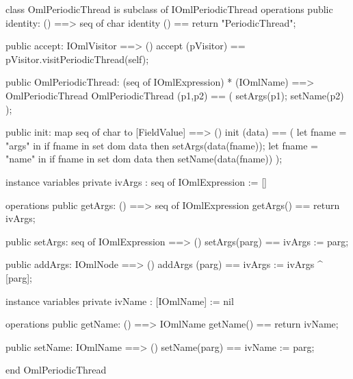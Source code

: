 \begin{vdm_al}
class OmlPeriodicThread is subclass of IOmlPeriodicThread
operations
  public identity: () ==> seq of char
  identity () == return "PeriodicThread";

  public accept: IOmlVisitor ==> ()
  accept (pVisitor) == pVisitor.visitPeriodicThread(self);

  public OmlPeriodicThread:
      (seq of IOmlExpression) *
      (IOmlName) ==> OmlPeriodicThread
  OmlPeriodicThread (p1,p2) == 
   ( setArgs(p1);
     setName(p2) );

  public init: map seq of char to [FieldValue] ==> ()
  init (data) ==
    ( let fname = "args" in
        if fname in set dom data
        then setArgs(data(fname));
      let fname = "name" in
        if fname in set dom data
        then setName(data(fname)) );

instance variables
  private ivArgs : seq of IOmlExpression := []

operations
  public getArgs: () ==> seq of IOmlExpression
  getArgs() == return ivArgs;

  public setArgs: seq of IOmlExpression ==> ()
  setArgs(parg) == ivArgs := parg;

  public addArgs: IOmlNode ==> ()
  addArgs (parg) == ivArgs := ivArgs ^ [parg];

instance variables
  private ivName : [IOmlName] := nil

operations
  public getName: () ==> IOmlName
  getName() == return ivName;

  public setName: IOmlName ==> ()
  setName(parg) == ivName := parg;

end OmlPeriodicThread
\end{vdm_al}

